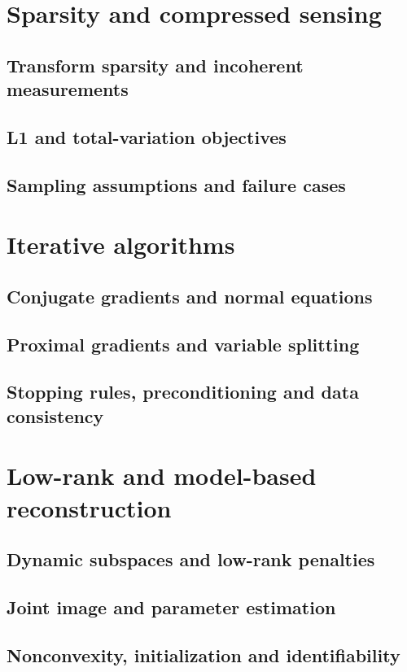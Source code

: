 \section{Sparsity and compressed sensing}
\label{sec:16:sparsity-and-compressed-sensing}
\subsection{Transform sparsity and incoherent measurements}
\subsection{L1 and total-variation objectives}
\subsection{Sampling assumptions and failure cases}

\section{Iterative algorithms}
\label{sec:16:iterative-algorithms}
\subsection{Conjugate gradients and normal equations}
\subsection{Proximal gradients and variable splitting}
\subsection{Stopping rules, preconditioning and data consistency}

\section{Low-rank and model-based reconstruction}
\label{sec:16:low-rank-and-model-based-reconstruction}
\subsection{Dynamic subspaces and low-rank penalties}
\subsection{Joint image and parameter estimation}
\subsection{Nonconvexity, initialization and identifiability}

